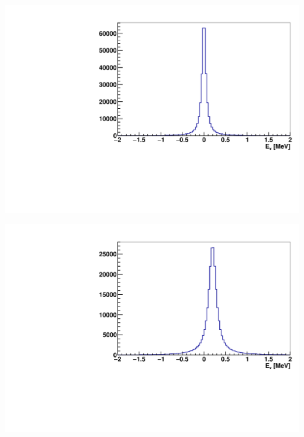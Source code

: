 \begin{enumerate}
    \begin{minipage}{0.49\linewidth} \centering
        \includegraphics[width=1.0\linewidth]{Imagenes/ExHisto/ExSampled_Ex0.00_incIdx0.pdf} 

        \label{Fig:04-Ex0}
    \end{minipage} \hfill
    \begin{minipage}{0.49\linewidth}
        \includegraphics[width=1.0\linewidth]{Imagenes/ExHisto/ExSampled_Ex0.20_incIdx0.pdf} 

        \label{Fig:04-Ex2}
    \end{minipage}
    

\end{enumerate}

